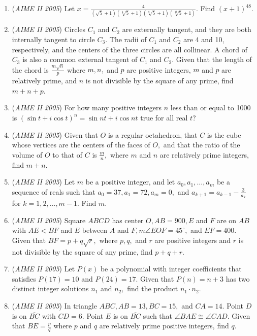 \begin{enumerate}
 

	\item (\textit{AIME II 2005}) Let $x=\frac{4}{(\sqrt{5}+1)(\sqrt[4]{5}+1)(\sqrt[8]{5}+1)(\sqrt[16]{5}+1)}.$ Find $(x+1)^{48}.$


	\item (\textit{AIME II 2005}) Circles $C_1$ and $C_2$ are externally tangent, and they are both internally tangent to circle $C_3.$ The radii of $C_1$  and $C_2$ are 4 and 10, respectively, and the centers of the three circles are all collinear. A chord of $C_3$ is also a common external tangent of $C_1$ and $C_2.$ Given that the length of the chord is $\frac{m\sqrt{n}}p$ where $m,n,$ and $p$ are positive integers, $m$ and $p$ are relatively prime, and $n$ is not divisible by the square of any prime, find $m+n+p.$


	\item (\textit{AIME II 2005}) For how many positive integers $n$ less than or equal to 1000 is $(\sin t + i \cos t)^n = \sin nt + i \cos nt$ true for all real $t$?


 

	\item (\textit{AIME II 2005}) Given that $O$ is a regular octahedron, that $C$ is the cube whose vertices are the centers of the faces of $O,$ and that the ratio of the volume of $O$ to that of $C$ is $\frac mn,$ where $m$ and $n$ are relatively prime integers, find $m+n.$


	\item (\textit{AIME II 2005}) Let $m$ be a positive integer, and let $a_0, a_1,\ldots,a_m$ be a sequence of reals such that $a_0 = 37, a_1 = 72, a_m = 0,$ and $a_{k+1} = a_{k-1} - \frac 3{a_k}$ for $k = 1,2,\ldots, m-1.$ Find $m.$


	\item (\textit{AIME II 2005}) Square $ABCD$ has center $O, AB=900, E$ and $F$ are on $AB$ with $AE<BF$ and $E$ between $A$ and $F, m\angle EOF =45^\circ,$ and $EF=400.$ Given that $BF=p+q\sqrt{r},$ where $p,q,$ and $r$ are positive integers and $r$ is not divisible by the square of any prime, find $p+q+r.$


	\item (\textit{AIME II 2005}) Let $P(x)$ be a polynomial with integer coefficients that satisfies $P(17)=10$ and $P(24)=17.$ Given that $P(n)=n+3$ has two distinct integer solutions $n_1$ and $n_2,$ find the product $n_1\cdot n_2.$


	\item (\textit{AIME II 2005}) In triangle $ABC, AB=13, BC=15,$ and $CA = 14.$ Point $D$ is on $\overline{BC}$ with $CD=6.$ Point $E$ is on $\overline{BC}$ such that $\angle BAE\cong \angle CAD.$ Given that $BE=\frac pq$ where $p$ and $q$ are relatively prime positive integers, find $q.$



\end{enumerate}
